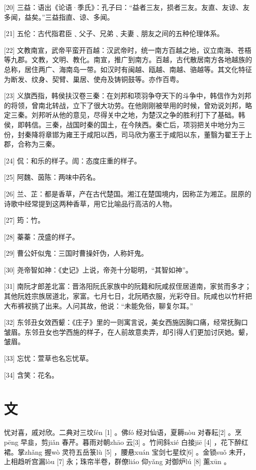 \documentclass[12pt,UTF8]{ctexbook}
\begin{document}
[20] 三益：语出《论语·季氏》：孔子曰：“益者三友，损者三友。友直、友谅、友多闻，益矣。”三益指直、谅、多闻。

[21] 五伦：古代指君臣﹑父子、兄弟﹑夫妻﹑朋友之间的五种伦理体系。

[22] 文教南宣，武帝平蛮开百越：汉武帝时，统一南方百越之地，议立南海、苍梧等九郡。文教，文明、教化。南宣，推广到南方。百越，古代散居南方各地越族的总称，居住两广、海南岛一带。如汉时有闽越、瓯越、南越、骆越等。其文化特征为断发、纹身、契臂、巢居、使舟及铸铜鼓等。亦作百粤。

[23] 义旗西指，韩侯扶汉卷三秦：在刘邦和项羽争夺天下的斗争中，韩信作为刘邦的将领，曾南北转战，立下了很大功劳。在他刚刚被举用的时候，曾劝说刘邦，略定三秦。刘邦听从他的意见，尽得关中之地，为楚汉之争的胜利打下了基础。韩侯，即韩信。三秦，战国时秦的国土，在今陕西。秦亡后，项羽把关中地分为三份，封秦降将章邯为雍王于咸阳以西，司马欣为塞王于咸阳以东，董翳为翟王于上郡，合称为三秦。

[24] 侃：和乐的样子。訚：态度庄重的样子。

[25] 阿魏、茵陈：两味中药名。

[26] 兰、芷：都是香草，产在古代楚国。湘江在楚国境内，因称芷为湘芷。屈原的诗歌中经常提到这两种香草，用它比喻品行高洁的人物。

[27] 筠：竹。

[28] 蓁蓁：茂盛的样子。

[29] 曹公奸似鬼：三国时曹操奸伪，人称奸鬼。

[30] 尧帝智如神：《史记》上说，帝尧十分聪明，“其智如神”。

[31] 南阮才郎差北富：晋洛阳阮氏家族中的阮籍和阮咸叔侄居道南，家贫而多才；其他阮姓宗族居道北，家富。七月七日，北阮晒衣服，光彩夺目。阮咸也以竹杆把大布裤衩挑了出来。人问其故，他说：“未能免俗，聊复尔耳。”

[32] 东邻丑女效西颦：《庄子》里的一则寓言说，美女西施因胸口痛，经常抚胸口皱眉。东邻丑女也学西施的样子，在人前故意卖弄，却引得人们更加讨厌她。颦，皱眉。

[33] 忘忧：萱草也名忘忧草。

[34] 含笑：花名。





\chapter{文}


忧对喜，戚对欣。二典对三坟fén [1] 。佛fó 经对仙语，夏耨nòu 对春耘[2] 。烹pēng 早韭，剪jiǎn 春芹。暮雨对朝zhāo 云[3] 。竹间斜xié 白接jiē [4] ，花下醉红裙。掌zhǎng 握wò 灵符五岳箓lù [5] ，腰悬xuán 宝剑七星纹[6] 。金锁suǒ 未开，上相趋听宫漏lòu [7] 永；珠帘半卷，群僚liáo 仰yǎng 对御炉lú [8] 薰xūn 。
\end{document}
